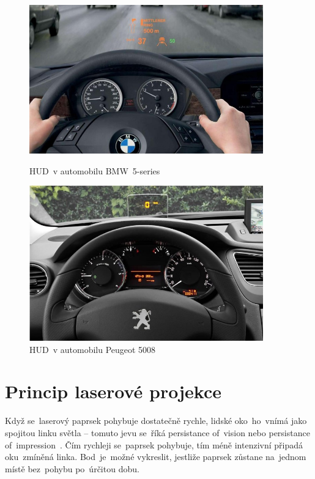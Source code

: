 \begin{figure}[htb]
  \centering
  \begin{minipage}{0.45\textwidth}
    \centering
  \includegraphics[width=0.9\textwidth]{img/huddd.jpg}
  \caption{\label{fig:huddd}  HUD~v automobilu  BMW~5-series~\cite{dev-of-laser-huds-in-driving}}
  \end{minipage}\hfill
  \begin{minipage}{0.45\textwidth}
    \centering
  \includegraphics[width=0.9\textwidth]{img/hudddd.jpg}
  \caption{\label{fig:hudddd}  HUD~v automobilu Peugeot 5008~\cite{dev-of-laser-huds-in-driving}}
  \end{minipage}
\end{figure}

\section{Princip laserové projekce}\label{sec:projection-princip}
Když se~laserový paprsek pohybuje dostatečně rychle, lidské  oko~ho~vnímá jako spojitou linku světla -- tomuto jevu se~říká persistance of~vision nebo persistance of~impression~\cite{persistance-of-vision}.
Čím rychleji se~paprsek pohybuje, tím méně intenzivní připadá  oku~zmíněná linka.  Bod~je~možné vykreslit, jestliže paprsek zůstane na~jednom místě  bez~pohybu po~úrčitou dobu.

